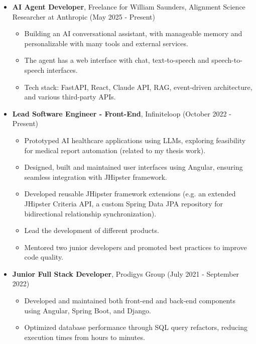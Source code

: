 \documentclass[a4paper,9pt]{article}
\newcommand{\cvsection}[2]{
    \vspace{0.3cm} %
    \noindent {\large \textbf{#1}} %
    \begin{itemize}
        \renewcommand{\labelitemi}{}
        \small #2 %
    \end{itemize}
}
\begin{document}
\cvsection{Professional Experience}{
    \item \textbf{AI Agent Developer}, Freelance for William Saunders, Alignment Science Researcher at Anthropic (May 2025 - Present)
    \begin{itemize}
        \item Building an AI conversational assistant, with manageable memory and personalizable with many tools and external services.
        \item The agent has a web interface with chat, text-to-speech and speech-to-speech interfaces.
        \item Tech stack: FastAPI, React, Claude API, RAG, event-driven architecture, and various third-party APIs.
    \end{itemize}
    \item \textbf{Lead Software Engineer - Front-End}, Infiniteloop (October 2022 - Present)
    \begin{itemize}
        \item Prototyped AI healthcare applications using LLMs, exploring feasibility for medical report automation (related to my thesis work).
        \item Designed, built and maintained user interfaces using Angular, ensuring seamless integration with JHipster framework.
        \item Developed reusable JHipster framework extensions (e.g. an extended JHipster Criteria API, a custom Spring Data JPA repository for bidirectional relationship synchronization).
        \item Lead the development of different products. 
        \item Mentored two junior developers and promoted best practices to improve code quality.
    \end{itemize}
    \item \textbf{Junior Full Stack Developer}, Prodigys Group (July 2021 - September 2022)
    \begin{itemize}
        \item Developed and maintained both front-end and back-end components using Angular, Spring Boot, and Django.
        \item Optimized database performance through SQL query refactors, reducing execution times from hours to minutes.
    \end{itemize}
}
\end{document}
